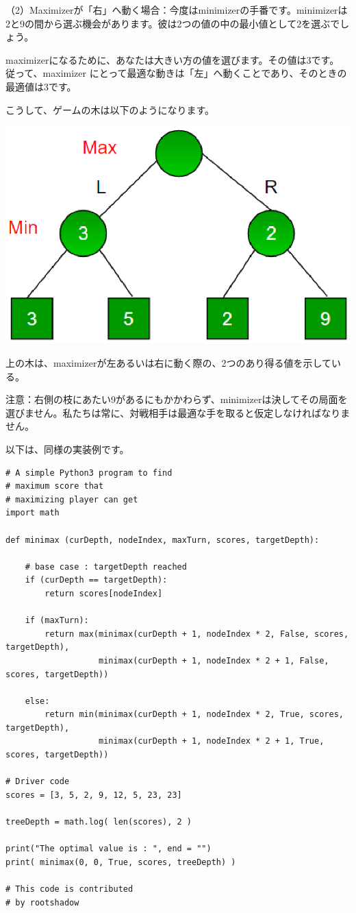 \documentclass[uplatex,a4paper,11pt,oneside,openany]{jsbook}
\begin{document}
（2）Maximizerが「右」へ動く場合：今度はminimizerの手番です。minimizerは2と9の間から選ぶ機会があります。彼は2つの値の中の最小値として2を選ぶでしょう。

maximizerになるために、あなたは大きい方の値を選びます。その値は3です。
従って、maximizer にとって最適な動きは「左」へ動くことであり、そのときの最適値は3です。

こうして、ゲームの木は以下のようになります。

\begin{center}
  \includegraphics[width=0.4\hsize]{figures/eps/minmax002.eps}
\end{center}

上の木は、maximizerが左あるいは右に動く際の、2つのあり得る値を示している。

注意：右側の枝にあたい9があるにもかかわらず、minimizerは決してその局面を選びません。私たちは常に、対戦相手は最適な手を取ると仮定しなければなりません。

以下は、同様の実装例です。


\begin{lstlisting}[caption=minimax000,label=prog001-1]
# A simple Python3 program to find
# maximum score that
# maximizing player can get
import math

def minimax (curDepth, nodeIndex, maxTurn, scores, targetDepth):

    # base case : targetDepth reached
    if (curDepth == targetDepth):
        return scores[nodeIndex]

    if (maxTurn):
        return max(minimax(curDepth + 1, nodeIndex * 2, False, scores, targetDepth),
                   minimax(curDepth + 1, nodeIndex * 2 + 1, False, scores, targetDepth))

    else:
        return min(minimax(curDepth + 1, nodeIndex * 2, True, scores, targetDepth),
                   minimax(curDepth + 1, nodeIndex * 2 + 1, True, scores, targetDepth))

# Driver code
scores = [3, 5, 2, 9, 12, 5, 23, 23]

treeDepth = math.log( len(scores), 2 )

print("The optimal value is : ", end = "")
print( minimax(0, 0, True, scores, treeDepth) )

# This code is contributed
# by rootshadow
\end{lstlisting}
\end{document}
